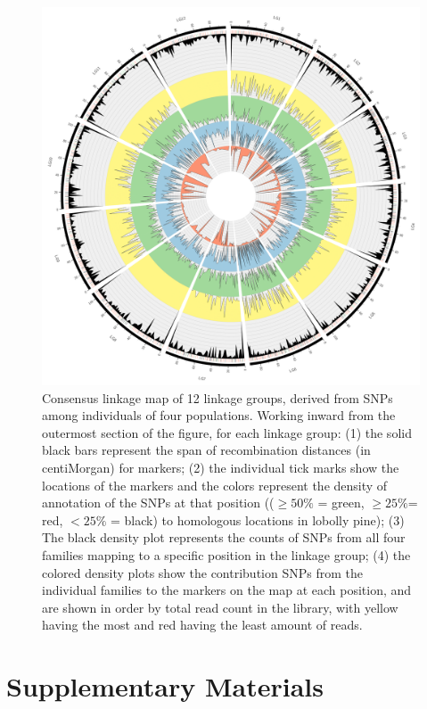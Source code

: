 \documentclass[smallextended]{svjour3}
\newcommand{\beginsupplement}{%
        \setcounter{table}{0}
        \renewcommand{\thetable}{S\arabic{table}}
        \setcounter{figure}{0}
        \renewcommand{\thefigure}{S\arabic{figure}}
        \renewcommand{\thesection}{S\arabic{section}}
        \renewcommand{\thesubsection}{S\arabic{subsection}} 
     }
\begin{document}
\begin{figure}[ht]
  \centering
  \includegraphics[width=\textwidth]{circos_con}
  \caption{Consensus linkage map of 12 linkage groups, derived from SNPs among
    individuals of four populations.  Working inward from the outermost section
    of the figure, for each linkage group: (1) the solid black bars represent
    the span of recombination distances (in centiMorgan) for markers; (2) the
    individual tick marks show the locations of the markers and the colors
    represent the density of annotation of the SNPs at that position (($\ge
    50\%$ = green, $\ge 25\%$= red, $< 25\%$ = black) to homologous locations in
    lobolly pine); (3) The black density plot represents the counts of SNPs from
    all four families mapping to a specific position in the linkage group; (4)
    the colored density plots show the contribution SNPs from the individual
    families to the markers on the map at each position, and are shown in order
    by total read count in the library, with yellow having the most and red
    having the least amount of reads.}
  \label{f:con}
\end{figure}

\clearpage

\beginsupplement

\section*{Supplementary Materials}
\end{document}
